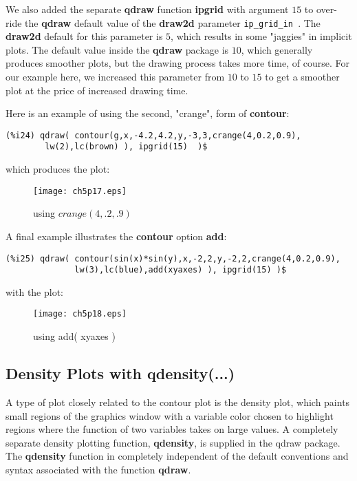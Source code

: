 \documentclass[12pt]{article}
\begin{document}
\newpage
We also added the separate \textbf{qdraw} function \textbf{ipgrid} with
  argument $15$ to over-ride the \textbf{qdraw} default value of the
  \textbf{draw2d} parameter \verb|ip_grid_in |. The \textbf{draw2d} default
  for this parameter is $5$, which results in some "jaggies" in implicit plots.
The default value inside the \textbf{qdraw} package is $10$, which generally
  produces smoother plots, but the drawing process takes more time, of course.
For our example here, we increased this parameter from $10$ to $15$ to get
  a smoother plot at the price of increased drawing time.

\smallskip
Here is an example of using the second, "crange", form of \textbf{contour}:
\small
\begin{verbatim}
(%i24) qdraw( contour(g,x,-4.2,4.2,y,-3,3,crange(4,0.2,0.9),
        lw(2),lc(brown) ), ipgrid(15)  )$
\end{verbatim}
\normalsize
which produces the plot:
\begin{figure} [h]
   \centerline{\texttt{[image: ch5p17.eps]} }
	\caption{using $crange(4,.2,.9)$ }
\end{figure} 

\smallskip
     
A final example illustrates the \textbf{contour} option \textbf{add}:
\small
\begin{verbatim}
(%i25) qdraw( contour(sin(x)*sin(y),x,-2,2,y,-2,2,crange(4,0.2,0.9),
              lw(3),lc(blue),add(xyaxes) ), ipgrid(15) )$
\end{verbatim}
\normalsize
with the plot:
\begin{figure} [h]
   \centerline{\texttt{[image: ch5p18.eps]} }
	\caption{using add( xyaxes ) }
\end{figure}      
\newpage

\subsection{Density Plots with qdensity(...)}
A type of plot closely related to the contour plot is the density plot,
  which paints small regions of the graphics window with a variable color
  chosen to highlight regions where the function of two variables takes
  on large values.
A completely separate density plotting function, \textbf{qdensity}, is
  supplied in the qdraw package.
The \textbf{qdensity} function in completely independent of the default
  conventions and syntax associated with the function \textbf{qdraw}.
\end{document}
